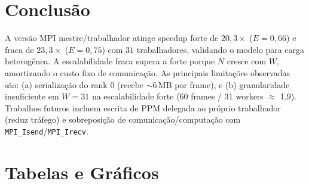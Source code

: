 \documentclass[twocolumn,a4paper,10pt]{article}
\begin{document}
\section{Conclusão}
A versão MPI mestre/trabalhador atinge speedup forte de $20{,}3\times$ ($E=0{,}66$) e fraca de $23{,}3\times$ ($E=0{,}75$) com $31$ trabalhadores, validando o modelo para carga heterogênea. A escalabilidade fraca supera a forte porque $N$ cresce com $W$, amortizando o custo fixo de comunicação. As principais limitações observadas são: (a) serialização do rank 0 (recebe $\sim$6\,MB por frame), e (b) granularidade insuficiente em $W{=}31$ na escalabilidade forte (60 frames / 31 workers $\approx$ 1{,}9). Trabalhos futuros incluem escrita de PPM delegada ao próprio trabalhador (reduz tráfego) e sobreposição de comunicação/computação com \texttt{MPI\_Isend}/\texttt{MPI\_Irecv}.

\onecolumn
\section*{Tabelas e Gráficos}
\end{document}

